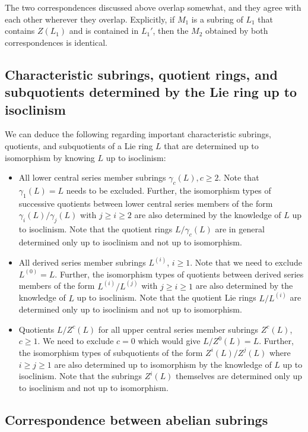 The two correspondences discussed above overlap somewhat, and they
agree with each other wherever they overlap. Explicitly, if $M_1$ is a
subring of $L_1$ that contains $Z(L_1)$ and is contained in $L_1'$,
then the $M_2$ obtained by both correspondences is identical.

\subsection{Characteristic subrings, quotient rings, and subquotients determined by the Lie ring up to isoclinism}

We can deduce the following regarding important characteristic
subrings, quotients, and subquotients of a Lie ring $L$ that are
determined up to isomorphism by knowing $L$ up to isoclinism:

\begin{itemize}
\item All lower central series member subrings $\gamma_c(L), c \ge
  2$. Note that $\gamma_1(L) = L$ needs to be excluded. Further, the
  isomorphism types of successive quotients between lower central
  series members of the form $\gamma_i(L)/\gamma_j(L)$ with $j \ge i
  \ge 2$ are also determined by the knowledge of $L$ up to
  isoclinism. Note that the quotient rings $L/\gamma_c(L)$ are in
  general determined only up to isoclinism and not up to isomorphism.

\item All derived series member subrings $L^{(i)}$, $i \ge 1$. Note
  that we need to exclude $L^{(0)} = L$. Further, the isomorphism
  types of quotients between derived series members of the form
  $L^{(i)}/L^{(j)}$ with $j \ge i \ge 1$ are also determined by the
  knowledge of $L$ up to isoclinism. Note that the quotient Lie rings
  $L/L^{(i)}$ are determined only up to isoclinism and not up to
  isomorphism.
\item Quotients $L/Z^c(L)$ for all upper central series member
  subrings $Z^c(L)$, $c \ge 1$. We need to exclude $c = 0$ which
  would give $L/Z^0(L) = L$. Further, the isomorphism types of
  subquotients of the form $Z^i(L)/Z^j(L)$ where $i \ge j \ge 1$ are
  also determined up to isomorphism by the knowledge of $L$ up to
  isoclinism. Note that the subrings $Z^i(L)$ themselves are
  determined only up to isoclinism and not up to isomorphism.
\end{itemize}

\subsection{Correspondence between abelian subrings}\label{sec:isoclinism-abelian-subrings}

